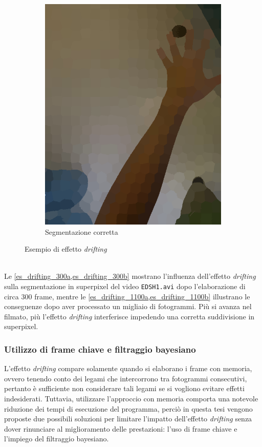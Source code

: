 \documentclass[12pt,a4paper,oneside]{article}
\begin{document}
\begin{figure}[!htb]
\begin{subfigure}[t]{.325\textwidth}
		\includegraphics[width=\textwidth]{resources/images/drifting1100c.png}
		\captionsetup{justification=centering}
		\caption{Segmentazione corretta}
	\end{subfigure}%
	\caption{Esempio di effetto \textit{drifting}}\label{es_drifting}
\end{figure}
\\Le \cref{es_drifting_300a,es_drifting_300b} mostrano l'influenza dell'effetto \textit{drifting} sulla segmentazione in superpixel del video \texttt{EDSH1.avi} dopo l'elaborazione di circa $300$ frame, mentre le \cref{es_drifting_1100a,es_drifting_1100b} illustrano le conseguenze dopo aver processato un migliaio di fotogrammi. Più si avanza nel filmato, più l'effetto \textit{drifting} interferisce impedendo una corretta suddivisione in superpixel.

\subsubsection{Utilizzo di frame chiave e filtraggio bayesiano}\label{Risultati_filtraggio}
L'effetto \textit{drifting} compare solamente quando si elaborano i frame con memoria, ovvero tenendo conto dei legami che intercorrono tra fotogrammi consecutivi, pertanto è sufficiente non considerare tali legami se si vogliono evitare effetti indesiderati. Tuttavia, utilizzare l'approccio con memoria comporta una notevole riduzione dei tempi di esecuzione del programma, perciò in questa tesi vengono proposte due possibili soluzioni per limitare l'impatto dell'effetto \textit{drifting} senza dover rinunciare al miglioramento delle prestazioni: l'uso di frame chiave e l'impiego del filtraggio bayesiano.
\end{document}
